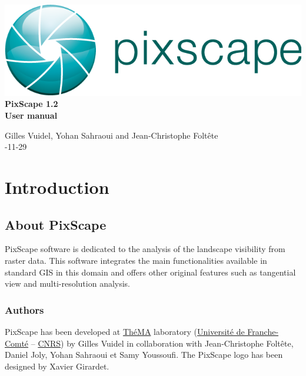\documentclass{report}
\begin{document}
 \begin{titlepage}
	
	\centering
	\includegraphics[scale=0.5]{img/logo.png}\\
	
	\bigskip
	\bigskip
	\bigskip	
	{\Huge
		\bfseries
		PixScape 1.2\\
		\bigskip
		User manual\\
	}
	\bigskip
	\bigskip
	\bigskip
	\bigskip
	\bigskip
	
	{\Large		
		Gilles Vuidel, Yohan Sahraoui and Jean-Christophe Foltête\\
		-11-29\\
	}
	
\end{titlepage}

\setcounter{tocdepth}{2}
\tableofcontents

\pagebreak

\chapter{Introduction}

\section{About PixScape}

PixScape software is dedicated to the analysis of the landscape visibility from raster data.
This software integrates the main functionalities available in standard GIS  in this domain and offers other original features such as tangential view and multi-resolution analysis.


\subsection{Authors}
PixScape has been developed at \href{http://thema.univ-fcomte.fr}{ThéMA} laboratory (\href{http://www.univ-fcomte.fr}{Université de Franche-Comté} – \href{http://www.cnrs.fr}{CNRS}) by Gilles Vuidel in collaboration with Jean-Christophe Foltête, Daniel Joly, Yohan Sahraoui et Samy Youssoufi. The PixScape logo has been designed by Xavier Girardet.
\end{document}
